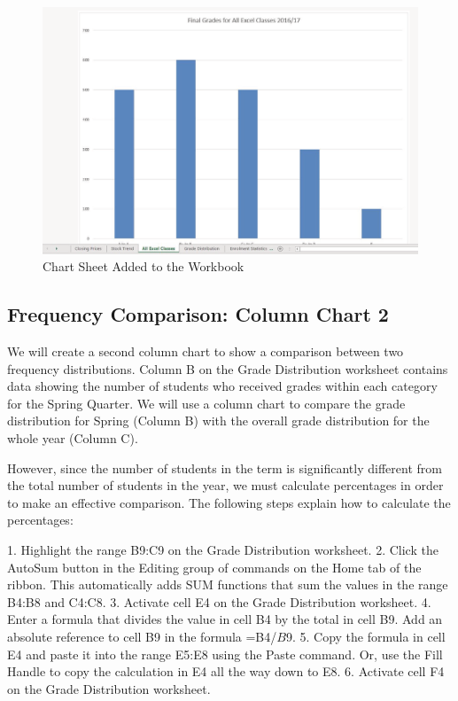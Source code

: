 \begin{figure}[H]
	\centering
	\includegraphics[width=\maxwidth{.95\linewidth}]{gfx/ch04_fig17}
	\caption{Chart Sheet Added to the Workbook}
	\label{04:fig17}
\end{figure}






\subsection{Frequency Comparison: Column Chart 2}

We will create a second column chart to show a comparison between two frequency distributions.
Column B on the Grade Distribution worksheet contains data showing the number of students who
received grades within each category for the Spring Quarter. We will use a column chart to compare
the grade distribution for Spring (Column B) with the overall grade distribution for the whole year
(Column C).

However, since the number of students in the term is significantly different from the total number
of students in the year, we must calculate percentages in order to make an effective comparison. The
following steps explain how to calculate the percentages:

1. Highlight the range B9:C9 on the Grade Distribution worksheet.
2. Click the AutoSum button in the Editing group of commands on the Home tab of the ribbon.
This automatically adds SUM functions that sum the values in the range B4:B8 and C4:C8.
3. Activate cell E4 on the Grade Distribution worksheet.
4. Enter a formula that divides the value in cell B4 by the total in cell B9. Add an absolute reference
to cell B9 in the formula =B4/$B$9.
5. Copy the formula in cell E4 and paste it into the range E5:E8 using the Paste command.
Or, use the Fill Handle to copy the calculation in E4 all the way down to E8.
6. Activate cell F4 on the Grade Distribution worksheet.



